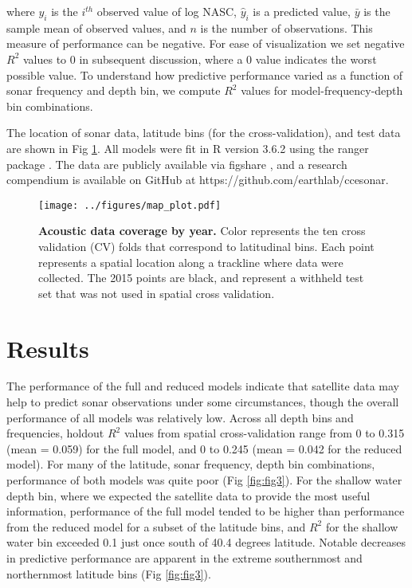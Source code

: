\documentclass[10pt,letterpaper]{article}
\begin{document}
where $y_i$ is the $i^{th}$ observed value of log NASC, $\hat{y}_i$ is a predicted value, $\bar{y}$ is the sample mean of observed values, and $n$ is the number of observations.
This measure of performance can be negative.
For ease of visualization we set negative $R^2$ values to 0 in subsequent discussion, where a 0 value indicates the worst possible value.
To understand how predictive performance varied as a function of sonar frequency and depth bin, we compute $R^2$ values for model-frequency-depth bin combinations.

The location of sonar data, latitude bins (for the cross-validation), and test data are shown in Fig \ref{fig:fig1}.
All models were fit in R version 3.6.2 using the ranger package \cite{ranger,rcore}.
The data are publicly available via figshare \cite{sonardata2020}, and a research compendium is available on GitHub at https://github.com/earthlab/ccesonar.

\begin{figure}[ht]
    \centering
    \texttt{[image: ../figures/map\_plot.pdf]}
    \caption{{\bf Acoustic data coverage by year.} Color represents the ten cross validation (CV) folds that correspond to latitudinal bins. Each point represents a spatial location along a trackline where data were collected. The 2015 points are black, and represent a withheld test set that was not used in spatial cross validation.}
    \label{fig:fig1}
\end{figure}


\section*{Results}
The performance of the full and reduced models indicate that satellite data may help to predict sonar observations under some circumstances, though the overall performance of all models was relatively low.
Across all depth bins and frequencies, holdout $R^2$ values from spatial cross-validation range from 0 to 0.315 (mean = 0.059) for the full model, and 0 to 0.245 (mean = 0.042 for the reduced model).
For many of the latitude, sonar frequency, depth bin combinations, performance of both models was quite poor (Fig \ref{fig:fig3}).
For the shallow water depth bin, where we expected the satellite data to provide the most useful information, performance of the full model tended to be higher than performance from the reduced model for a subset of the latitude bins, and $R^2$ for the shallow water bin exceeded 0.1 just once south of 40.4 degrees latitude.
Notable decreases in predictive performance are apparent in the extreme southernmost and northernmost latitude bins (Fig \ref{fig:fig3}).
\end{document}

